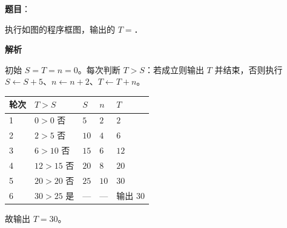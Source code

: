 \begin{answer}

\textbf{题目}：

执行如图的程序框图，输出的 $T=$\gkblank{}．
\nopagebreak[4]
\begin{center}\end{center}
\nopagebreak[4]
\textbf{解析}

初始 $S=T=n=0$。每次判断 $T>S$：若成立则输出 $T$ 并结束，否则执行 $S\leftarrow S+5$、$n\leftarrow n+2$、$T\leftarrow T+n$。

\begin{center}
\begin{tabular}{lllll}
\toprule
轮次 & $T>S$ & $S$ & $n$ & $T$ \\
\midrule
1 & $0>0$ 否 & $5$ & $2$ & $2$ \\
2 & $2>5$ 否 & $10$ & $4$ & $6$ \\
3 & $6>10$ 否 & $15$ & $6$ & $12$ \\
4 & $12>15$ 否 & $20$ & $8$ & $20$ \\
5 & $20>20$ 否 & $25$ & $10$ & $30$ \\
6 & $30>25$ 是 & — & — & 输出 $30$ \\
\bottomrule
\end{tabular}
\end{center}

故输出 $T=30$。


\end{answer}
